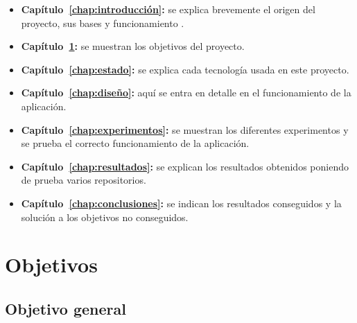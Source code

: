 \documentclass[a4paper, 12pt]{book}
\begin{document}
\begin{itemize}
  \item \textbf{Capítulo~\ref{chap:introducción}:} se explica brevemente el origen del proyecto, sus bases y funcionamiento .
  
  \item \textbf{Capítulo~\ref{chap:objetivos}:} se muestran los objetivos del proyecto.
  
  \item \textbf{Capítulo~\ref{chap:estado}:} se explica cada tecnología usada en este proyecto.
  
  \item \textbf{Capítulo~\ref{chap:diseño}:} aquí se entra en detalle en el funcionamiento de la aplicación.
  
  \item \textbf{Capítulo~\ref{chap:experimentos}:} se muestran los diferentes experimentos y se prueba el correcto funcionamiento de la aplicación.
  
  \item \textbf{Capítulo~\ref{chap:resultados}:} se explican los resultados obtenidos poniendo de prueba varios repositorios.
  
  \item \textbf{Capítulo~\ref{chap:conclusiones}:} se indican los resultados conseguidos y la solución a los objetivos no conseguidos.
  
\end{itemize}




\cleardoublepage %
\chapter{Objetivos} %
\label{chap:objetivos} %

\section{Objetivo general} %
\label{sec:objetivo-general} %
\end{document}
